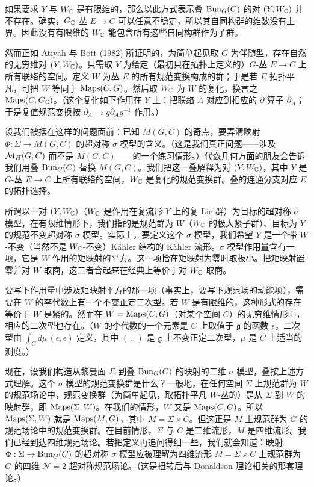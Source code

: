 如果要求 $Y$ 与 $W_{\mathbb{C}}$ 是有限维的，那么以此方式表示叠 $\mathrm{Bun}_{G}(C)$ 的对 $(Y,W_{\mathbb{C}})$ 并不存在。确实，$G_{\mathbb{C}}$-丛 $E\to C$ 可以任意不稳定，所以其自同构群的维数没有上界。因此没有有限维的 $W_{\mathbb{C}}$ 能包含所有这些自同构群作为子群。

然而正如 Atiyah 与 Bott (1982) 所证明的，为简单起见取 $G$ 为伴随型，存在自然的无穷维对 $(Y,W_{\mathbb{C}})$。只需取 $Y$ 为给定（最初只在拓扑上定义的）$G$-丛 $E\to C$ 上所有联络的空间。定义 $W$ 为丛 $E$ 的所有规范变换构成的群；于是若 $E$ 拓扑平凡，可把 $W$ 等同于 $\operatorname{Maps}(C,G)$。然后取 $W_{\mathbb{C}}$ 为 $W$ 的复化，换言之 $\operatorname{Maps}(C,G_{\mathbb{C}})$。（这个复化如下作用在 $Y$ 上：把联络 $A$ 对应到相应的 $\bar\partial$ 算子 $\bar\partial_{A}$；于是复值规范变换按 $\bar\partial_{A}\to g\bar\partial_{A}g^{-1}$ 作用。）

设我们被摆在这样的问题面前：已知 $M(G,C)$ 的奇点，要弄清映射 $\Phi:\Sigma\to M(G,C)$ 的超对称 $\sigma$ 模型的含义。（这是我们真正问题——涉及 $\mathcal{M}_{H}(G,C)$ 而不是 $M(G,C)$——的一个练习情形。）代数几何方面的朋友会告诉我们用叠 $\mathrm{Bun}_{G}(C)$ 替换 $M(G,C)$。我们把这一叠解释为对 $(Y,W_{\mathbb{C}})$，其中 $Y$ 是 $G$-丛 $E\to C$ 上所有联络的空间，$W_{\mathbb{C}}$ 是复化的规范变换群。叠的连通分支对应 $E$ 的拓扑选择。

所谓以一对 $(Y,W_{\mathbb{C}})$（$W_{\mathbb{C}}$ 是作用在复流形 $Y$ 上的复 Lie 群）为目标的超对称 $\sigma$ 模型，在有限维情形下，我们指的是规范群为 $W$（$W_{\mathbb{C}}$ 的极大紧子群）、目标为 $Y$ 的规范不变超对称 $\sigma$ 模型。实际上，要定义这个 $\sigma$ 模型，我们希望 $Y$ 是一个带 $W$-不变（当然不是 $W_{\mathbb{C}}$-不变）Kähler 结构的 Kähler 流形。$\sigma$ 模型作用量含有一项，它是 $W$ 作用的矩映射的平方。这一项恰在矩映射为零时取极小。把矩映射置零并对 $W$ 取商，这二者合起来在经典上等价于对 $W_{\mathbb{C}}$ 取商。

要写下作用量中涉及矩映射平方的那一项（事实上，要写下规范场的动能项），需要在 $W$ 的李代数上有一个不变正定二次型。若 $W$ 是有限维的，这种形式的存在等价于 $W$ 是紧的。然而在 $W=\operatorname{Maps}(C,G)$（对某个空间 $C$）的无穷维情形中，相应的二次型也存在。（$W$ 的李代数的一个元素是 $C$ 上取值于 $\mathfrak{g}$ 的函数 $\epsilon$，二次型由 $\int_{C}d\mu\,(\epsilon,\epsilon)$ 定义，其中 $(\ ,\ )$ 是 $\mathfrak{g}$ 上不变正定二次型，$\mu$ 是 $C$ 上适当的测度。）

现在，设我们构造从黎曼面 $\Sigma$ 到叠 $\mathrm{Bun}_{G}(C)$ 的映射的二维 $\sigma$ 模型，叠按上述方式理解。这个 $\sigma$ 模型的规范变换群是什么？一般地，在任何空间 $\Sigma$ 上规范群为 $W$ 的规范场论中，规范变换群（为简单起见，取拓扑平凡 $W$-丛的）是从 $\Sigma$ 到 $W$ 的映射群，即 $\operatorname{Maps}(\Sigma,W)$。在我们的情形，$W$ 又是 $\operatorname{Maps}(C,G)$。所以 $\operatorname{Maps}(\Sigma,W)$ 就是 $\operatorname{Maps}(M,G)$，其中 $M=\Sigma\times C$。但这正是 $M$ 上规范群为 $G$ 的规范场论中的规范变换群。在目前情形，$\Sigma$ 与 $C$ 是二维流形，$M$ 是四维流形。我们已经到达四维规范场论。若把定义再追问得细一些，我们就会知道：映射 $\Phi:\Sigma\to\mathrm{Bun}_{G}(C)$ 的超对称 $\sigma$ 模型应被理解为四维流形 $M=\Sigma\times C$ 上规范群为 $G$ 的四维 $\mathcal{N}=2$ 超对称规范场论。（这是扭转后与 Donaldson 理论相关的那套理论。）

